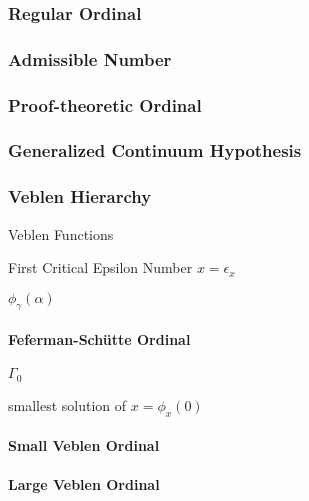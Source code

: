 \subsubsection{Regular Ordinal}\label{sec:regular_ordinal}

\subsubsection{Admissible Number}\label{sec:admissible_ordinal}

\subsubsection{Proof-theoretic Ordinal}\label{sec:proof_ordinal}

\subsubsection{Generalized Continuum Hypothesis}
\label{sec:generalized_continuum}

\subsubsection{Veblen Hierarchy}\label{sec:veblen_hierarchy}

Veblen Functions %

First Critical Epsilon Number $x = \epsilon_x$ %

$\phi_\gamma(\alpha)$



\paragraph{Feferman-Sch\"utte Ordinal}\label{sec:feferman_schutte}\hfill

$\Gamma_0$

smallest solution of $x = \phi_x(0)$



\paragraph{Small Veblen Ordinal}\label{sec:small_veblen}\hfill

\paragraph{Large Veblen Ordinal}\label{sec:large_veblen}\hfill



